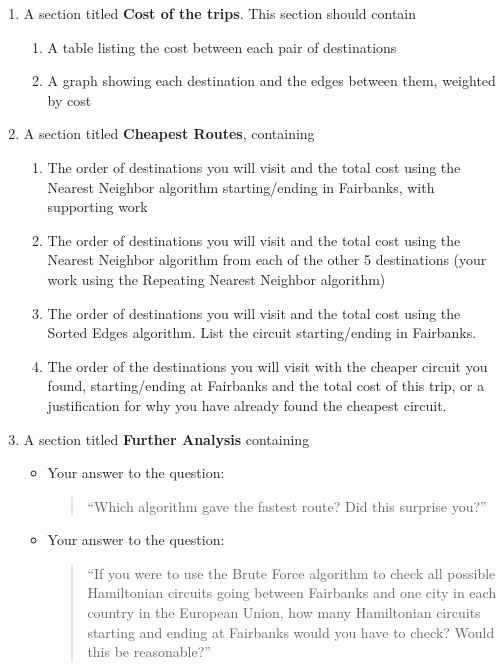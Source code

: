 \documentclass[12pt]{article}
\newcommand{\be}{\begin{enumerate}}
\newcommand{\ee}{\end{enumerate}}
\begin{document}
\begin{enumerate}

\item A section titled {\bf Cost of the trips}. This section should contain
\be
\item A table listing the cost between each pair of destinations
\item A graph showing each destination and the edges between them, weighted by cost
\ee
\item A section titled {\bf Cheapest Routes}, containing
\be
\item The order of destinations you will visit and the total cost using the
    Nearest Neighbor algorithm starting/ending in Fairbanks, with supporting work
  \item The order of destinations you will visit and the total cost using the
    Nearest Neighbor algorithm from each of the other 5 destinations
    (your work
    using the Repeating Nearest Neighbor algorithm)
  \item The order of destinations you will visit and the total cost using the
    Sorted Edges algorithm. List the circuit starting/ending in Fairbanks.
    \item The order of the destinations you will visit with the cheaper circuit you found, 
    starting/ending at Fairbanks and the total cost of this trip, or  a justification for why you have already found the cheapest circuit.  
    \ee
    
    \item A section titled {\bf Further Analysis} containing 
  \begin{itemize}
  \item Your answer to the question: 
  \begin{quote}``Which algorithm gave the fastest
    route? Did this
    surprise you?''\end{quote}
  \item Your answer to the question: 
  \begin{quote}``If you were to use the Brute
    Force algorithm to
    check all  possible Hamiltonian circuits going between Fairbanks and one city in each country in the European Union, how many Hamiltonian
    circuits
    starting and ending at Fairbanks would you have to check? Would this
    be
    reasonable?''
    \end{quote}
  \end{itemize}


\end{enumerate}
\end{document}
